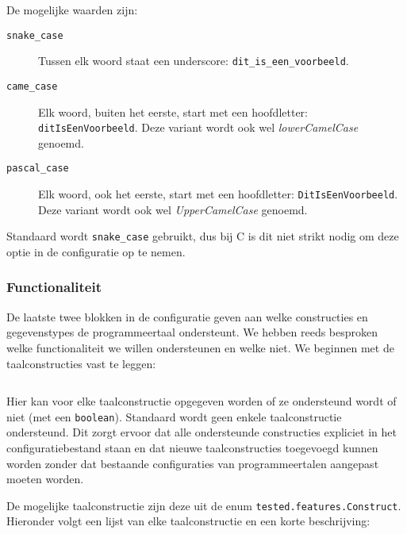 \inputminted[firstline=15,lastline=18,gobble=2]{js}{sources/c-config.json}

De mogelijke waarden zijn:

\begin{description}
    \item[\texttt{snake\_case}] Tussen elk woord staat een underscore: \texttt{dit\_is\_een\_voorbeeld}.
    \item[\texttt{came\_case}] Elk woord, buiten het eerste, start met een hoofdletter: \texttt{ditIsEenVoorbeeld}.
    Deze variant wordt ook wel \emph{lowerCamelCase} genoemd.
    \item[\texttt{pascal\_case}] Elk woord, ook het eerste, start met een hoofdletter: \texttt{DitIsEenVoorbeeld}.
    Deze variant wordt ook wel \emph{UpperCamelCase} genoemd.
\end{description}

Standaard wordt \texttt{snake\_case} gebruikt, dus bij C is dit niet strikt nodig om deze optie in de configuratie op te nemen.

\subsubsection{Functionaliteit}

De laatste twee blokken in de configuratie geven aan welke constructies en gegevenstypes de programmeertaal ondersteunt.
We hebben reeds besproken welke functionaliteit we willen ondersteunen en welke niet.
We beginnen met de taalconstructies vast te leggen:

\inputminted[firstline=19,lastline=27,gobble=2]{js}{sources/c-config.json}

Hier kan voor elke taalconstructie opgegeven worden of ze ondersteund wordt of niet (met een \texttt{boolean}).
Standaard wordt geen enkele taalconstructie ondersteund.
Dit zorgt ervoor dat alle ondersteunde constructies expliciet in het configuratiebestand staan en dat nieuwe taalconstructies toegevoegd kunnen worden zonder dat bestaande configuraties van programmeertalen aangepast moeten worden.

De mogelijke taalconstructie zijn deze uit de enum \texttt{tested.features.Construct}.
Hieronder volgt een lijst van elke taalconstructie en een korte beschrijving:

